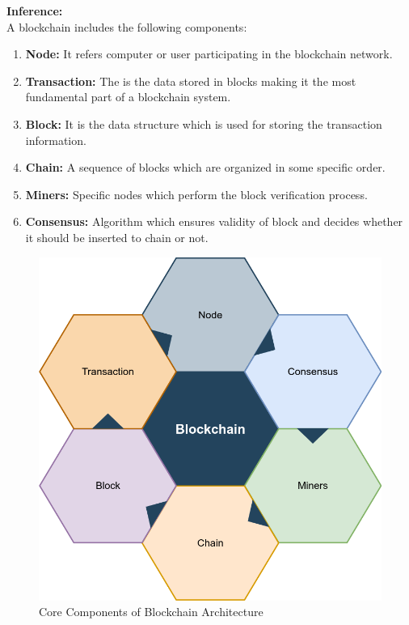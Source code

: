 \documentclass[oneside, 12pt]{book}
\begin{document}
\begin{enumerate}
					\textbf{Inference:}
					\\A blockchain includes the following components:
					\begin{enumerate}[i]
						\item\textbf{Node:} It refers computer or user participating in the blockchain network.
						\item\textbf{Transaction:} The is the data stored in blocks making it the most fundamental part of a blockchain system.
						\item\textbf{Block:} It is the data structure which is used for storing the transaction information.
						\item\textbf{Chain:} A sequence of blocks which are organized in some specific order.
						\item\textbf{Miners:} Specific nodes which perform the block verification process.
						\item\textbf{Consensus:} Algorithm which ensures validity of block and decides whether it should be inserted to chain or not.
					\end{enumerate}
					\begin{figure}[H]
						\centering
						\includegraphics[width=0.6\linewidth]{./Resources/core-components.png}
					    \caption{Core Components of Blockchain Architecture}
					    \label{fig:core-components}
					\end{figure}
			\end{enumerate}
\end{document}
